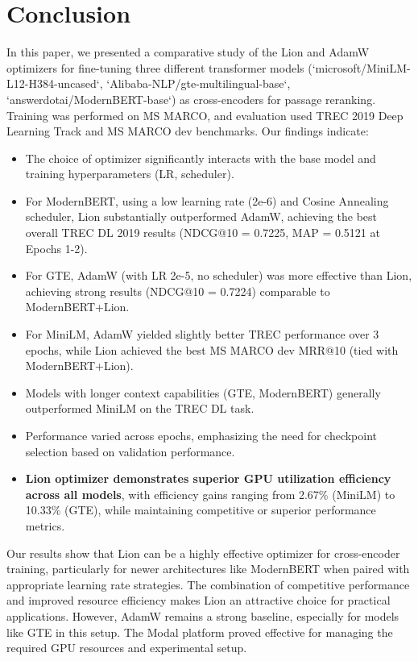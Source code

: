 \documentclass[conference]{IEEEtran}
\begin{document}
\section{Conclusion}
\label{sec:conclusion}
In this paper, we presented a comparative study of the Lion and AdamW optimizers for fine-tuning three different transformer models (`microsoft/MiniLM-L12-H384-uncased`, `Alibaba-NLP/gte-multilingual-base`, `answerdotai/ModernBERT-base`) as cross-encoders for passage reranking. Training was performed on MS MARCO, and evaluation used TREC 2019 Deep Learning Track and MS MARCO dev benchmarks. Our findings indicate:
\begin{itemize}
    \item The choice of optimizer significantly interacts with the base model and training hyperparameters (LR, scheduler).
    \item For ModernBERT, using a low learning rate (2e-6) and Cosine Annealing scheduler, Lion substantially outperformed AdamW, achieving the best overall TREC DL 2019 results (NDCG@10 = 0.7225, MAP = 0.5121 at Epochs 1-2).
    \item For GTE, AdamW (with LR 2e-5, no scheduler) was more effective than Lion, achieving strong results (NDCG@10 = 0.7224) comparable to ModernBERT+Lion.
    \item For MiniLM, AdamW yielded slightly better TREC performance over 3 epochs, while Lion achieved the best MS MARCO dev MRR@10 (tied with ModernBERT+Lion).
    \item Models with longer context capabilities (GTE, ModernBERT) generally outperformed MiniLM on the TREC DL task.
    \item Performance varied across epochs, emphasizing the need for checkpoint selection based on validation performance.
    \item \textbf{Lion optimizer demonstrates superior GPU utilization efficiency across all models}, with efficiency gains ranging from 2.67\% (MiniLM) to 10.33\% (GTE), while maintaining competitive or superior performance metrics.
\end{itemize}
Our results show that Lion can be a highly effective optimizer for cross-encoder training, particularly for newer architectures like ModernBERT when paired with appropriate learning rate strategies. The combination of competitive performance and improved resource efficiency makes Lion an attractive choice for practical applications. However, AdamW remains a strong baseline, especially for models like GTE in this setup. The Modal platform proved effective for managing the required GPU resources and experimental setup.
\end{document}
